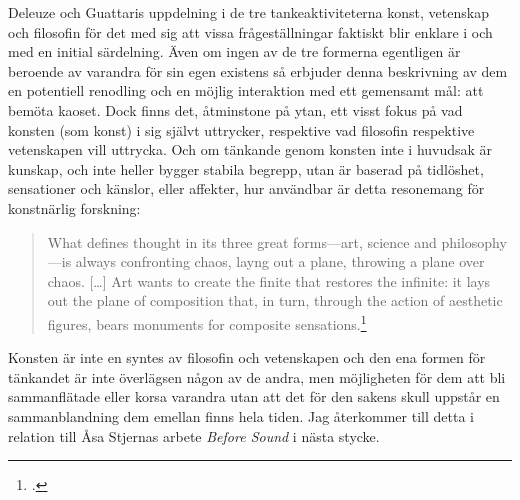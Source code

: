 \documentclass[11pt]{article}
\begin{document}
Deleuze och Guattaris uppdelning i de tre tankeaktiviteterna konst,
vetenskap och filosofin för det med sig att vissa frågeställningar
faktiskt blir enklare i och med en initial särdelning. Även om ingen
av de tre formerna egentligen är beroende av varandra för sin egen
existens så erbjuder denna beskrivning av dem en potentiell renodling
och en möjlig interaktion med ett gemensamt mål: att bemöta kaoset.
Dock finns det, åtminstone på ytan, ett visst fokus på vad konsten
(som konst) i sig självt uttrycker, respektive vad filosofin
respektive vetenskapen vill uttrycka. Och om tänkande genom konsten
inte i huvudsak är kunskap, och inte heller bygger stabila begrepp,
utan är baserad på tidlöshet, sensationer och känslor, eller affekter,
hur användbar är detta resonemang för konstnärlig forskning:
\begin{quote}
    What defines thought in its three great forms---art, science and
    philosophy---is always confronting chaos, layng out a plane,
    throwing a plane over chaos. [\ldots] Art wants to create the
    finite that restores the infinite: it lays out the plane of
    composition that, in turn, through the action of aesthetic
    figures, bears monuments for composite
    sensations.\footcite[sid. 197]{deleuze1994}
\end{quote}
Konsten är inte en syntes av filosofin och vetenskapen och den ena
formen för tänkandet är inte överlägsen någon av de andra, men
möjligheten för dem att bli sammanflätade eller korsa varandra utan
att det för den sakens skull uppstår en sammanblandning dem emellan
finns hela tiden. Jag återkommer till detta i relation till Åsa
Stjernas arbete \emph{Before Sound} i nästa stycke.


\end{document}
